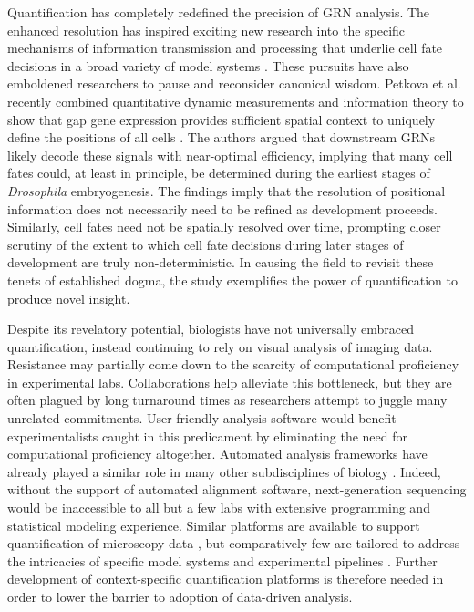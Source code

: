 Quantification has completely redefined the precision of GRN analysis. The enhanced resolution has inspired exciting new research into the specific mechanisms of information transmission and processing that underlie cell fate decisions in a broad variety of model systems \cite{Pelaez2015a,Frick2017,Wolff2018,Petkova2019}. These pursuits have also emboldened researchers to pause and reconsider canonical wisdom. Petkova et al. recently combined quantitative dynamic measurements and information theory to show that gap gene expression provides sufficient spatial context to uniquely define the positions of all cells \cite{Petkova2019}. The authors argued that downstream GRNs likely decode these signals with near-optimal efficiency, implying that many cell fates could, at least in principle, be determined during the earliest stages of \emph{Drosophila} embryogenesis. The findings imply that the resolution of positional information does not necessarily need to be refined as development proceeds. Similarly, cell fates need not be spatially resolved over time, prompting closer scrutiny of the extent to which cell fate decisions during later stages of development are truly non-deterministic. In causing the field to revisit these tenets of established dogma, the study exemplifies the power of quantification to produce novel insight.

Despite its revelatory potential, biologists have not universally embraced quantification, instead continuing to rely on visual analysis of imaging data. Resistance may partially come down to the scarcity of computational proficiency in experimental labs. Collaborations help alleviate this bottleneck, but they are often plagued by long turnaround times as researchers attempt to juggle many unrelated commitments. User-friendly analysis software would benefit experimentalists caught in this predicament by eliminating the need for computational proficiency altogether. Automated analysis frameworks have already played a similar role in many other subdisciplines of biology \cite{Aghaeepour2013,Chen2015,Pyne2009,Bernstein2008,Hellemans2007,Langmead2012,Trapnell2009,Costes2004,Kelley2015,Carpenter2006,Paintdakhi2016,Schindelin2012,Sommer2011}. Indeed, without the support of automated alignment software, next-generation sequencing would be inaccessible to all but a few labs with extensive programming and statistical modeling experience. Similar platforms are available to support quantification of microscopy data \cite{Schindelin2015,Sbalzarini2016}, but comparatively few are tailored to address the intricacies of specific model systems and experimental pipelines \cite{Jug2014}. Further development of context-specific quantification platforms is therefore needed in order to lower the barrier to adoption of data-driven analysis.

